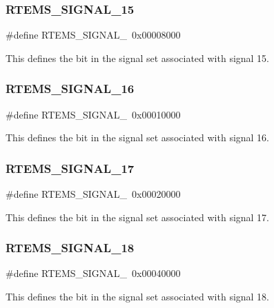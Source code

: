\subsubsection{\texorpdfstring{RTEMS\_SIGNAL\_15}{RTEMS\_SIGNAL\_15}}
{\footnotesize\ttfamily \#define R\+T\+E\+M\+S\+\_\+\+S\+I\+G\+N\+A\+L\+\_~0x00008000}

This defines the bit in the signal set associated with signal 15. \mbox{\label{group__ClassicASR_ga56d359a5054a316cd4d7f09a80f0d077}} 
\subsubsection{\texorpdfstring{RTEMS\_SIGNAL\_16}{RTEMS\_SIGNAL\_16}}
{\footnotesize\ttfamily \#define R\+T\+E\+M\+S\+\_\+\+S\+I\+G\+N\+A\+L\+\_~0x00010000}

This defines the bit in the signal set associated with signal 16. \mbox{\label{group__ClassicASR_ga2a7ef2148d652d1dc510bd5ca9c10457}} 
\subsubsection{\texorpdfstring{RTEMS\_SIGNAL\_17}{RTEMS\_SIGNAL\_17}}
{\footnotesize\ttfamily \#define R\+T\+E\+M\+S\+\_\+\+S\+I\+G\+N\+A\+L\+\_~0x00020000}

This defines the bit in the signal set associated with signal 17. \mbox{\label{group__ClassicASR_ga5b038f7c69656f14ee4441147193e2ad}} 
\subsubsection{\texorpdfstring{RTEMS\_SIGNAL\_18}{RTEMS\_SIGNAL\_18}}
{\footnotesize\ttfamily \#define R\+T\+E\+M\+S\+\_\+\+S\+I\+G\+N\+A\+L\+\_~0x00040000}

This defines the bit in the signal set associated with signal 18. \mbox{\label{group__ClassicASR_ga28e9e3436c18411b7c83ff7d7cb8bbb8}} 
